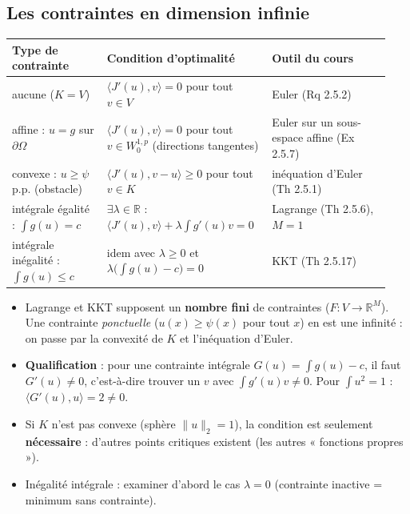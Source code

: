 \documentclass[10pt,a4paper]{article}
\newcommand{\R}{\mathbb{R}}
\newcommand{\sca}[2]{\langle #1,#2\rangle}
\newcommand{\nr}[1]{\|#1\|}
\begin{document}
\subsection{Les contraintes en dimension infinie}\label{sec:contraintes}
\begin{center}
\renewcommand{\arraystretch}{1.3}
\begin{tabular}{@{}>{\raggedright}p{0.24\linewidth}>{\raggedright}p{0.4\linewidth}>{\raggedright\arraybackslash}p{0.3\linewidth}@{}}
\toprule
\textbf{Type de contrainte} & \textbf{Condition d'optimalité} & \textbf{Outil du cours}\\\midrule
aucune ($K=V$) & $\sca{J'(u)}v=0$ pour tout $v\in V$ & Euler (Rq 2.5.2)\\
affine : $u=g$ sur $\partial\Omega$ & $\sca{J'(u)}v=0$ pour tout $v\in W^{1,p}_0$ (directions tangentes) & Euler sur un sous-espace affine (Ex 2.5.7)\\
convexe : $u\ge\psi$ p.p. (obstacle) & $\sca{J'(u)}{v-u}\ge0$ pour tout $v\in K$ & inéquation d'Euler (Th 2.5.1)\\
intégrale égalité : $\int g(u)=c$ & $\exists\lambda\in\R$ : $\sca{J'(u)}v+\lambda\int g'(u)v=0$ & Lagrange (Th 2.5.6), $M=1$\\
intégrale inégalité : $\int g(u)\le c$ & idem avec $\lambda\ge0$ et $\lambda\big(\int g(u)-c\big)=0$ & KKT (Th 2.5.17)\\
\bottomrule
\end{tabular}
\end{center}
\begin{piege}
\begin{itemize}
\item Lagrange et KKT supposent un \textbf{nombre fini} de contraintes ($F:V\to\R^M$). Une contrainte \emph{ponctuelle} ($u(x)\ge\psi(x)$ pour tout $x$) en est une infinité : on passe par la convexité de $K$ et l'inéquation d'Euler.
\item \textbf{Qualification} : pour une contrainte intégrale $G(u)=\int g(u)-c$, il faut $G'(u)\ne0$, c'est-à-dire trouver un $v$ avec $\int g'(u)v\ne0$. Pour $\int u^2=1$ : $\sca{G'(u)}u=2\ne0$.
\item Si $K$ n'est pas convexe (sphère $\nr u_2=1$), la condition est seulement \textbf{nécessaire} : d'autres points critiques existent (les autres « fonctions propres »).
\item Inégalité intégrale : examiner d'abord le cas $\lambda=0$ (contrainte inactive = minimum sans contrainte).
\end{itemize}
\end{piege}
\end{document}

